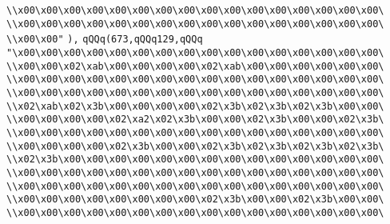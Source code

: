 \verb|\\x00\x00\x00\x00\x00\x00\x00\x00\x00\x00\x00\x00\x00\x00\x00\x00\|\newline
\verb|\\x00\x00\x00\x00\x00\x00\x00\x00\x00\x00\x00\x00\x00\x00\x00\x00\|\newline
\verb|\\x00\x00"|\newline
\verb|),|\newline
\verb|qQQq(673,qQQq129,qQQq|\newline
\verb|"\x00\x00\x00\x00\x00\x00\x00\x00\x00\x00\x00\x00\x00\x00\x00\x00\|\newline
\verb|\\x00\x00\x02\xab\x00\x00\x00\x00\x02\xab\x00\x00\x00\x00\x00\x00\|\newline
\verb|\\x00\x00\x00\x00\x00\x00\x00\x00\x00\x00\x00\x00\x00\x00\x00\x00\|\newline
\verb|\\x00\x00\x00\x00\x00\x00\x00\x00\x00\x00\x00\x00\x00\x00\x00\x00\|\newline
\verb|\\x02\xab\x02\x3b\x00\x00\x00\x00\x02\x3b\x02\x3b\x02\x3b\x00\x00\|\newline
\verb|\\x00\x00\x00\x00\x02\xa2\x02\x3b\x00\x00\x02\x3b\x00\x00\x02\x3b\|\newline
\verb|\\x00\x00\x00\x00\x00\x00\x00\x00\x00\x00\x00\x00\x00\x00\x00\x00\|\newline
\verb|\\x00\x00\x00\x00\x02\x3b\x00\x00\x02\x3b\x02\x3b\x02\x3b\x02\x3b\|\newline
\verb|\\x02\x3b\x00\x00\x00\x00\x00\x00\x00\x00\x00\x00\x00\x00\x00\x00\|\newline
\verb|\\x00\x00\x00\x00\x00\x00\x00\x00\x00\x00\x00\x00\x00\x00\x00\x00\|\newline
\verb|\\x00\x00\x00\x00\x00\x00\x00\x00\x00\x00\x00\x00\x00\x00\x00\x00\|\newline
\verb|\\x00\x00\x00\x00\x00\x00\x00\x00\x02\x3b\x00\x00\x02\x3b\x00\x00\|\newline
\verb|\\x00\x00\x00\x00\x00\x00\x00\x00\x00\x00\x00\x00\x00\x00\x00\x00\|\newline
